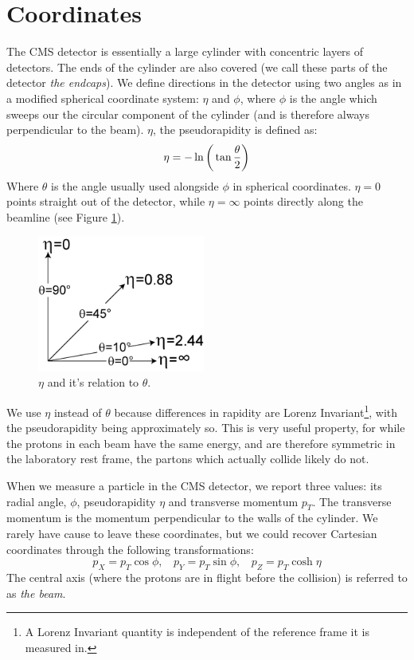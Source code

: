 \section{Coordinates}
The CMS detector is essentially a large cylinder with concentric layers of detectors. The ends of the cylinder are also covered (we call these parts of the detector \textit{the endcaps}). We define directions in the detector using two angles as in a modified spherical coordinate system: $\eta$ and $\phi$, where $\phi$ is the angle which sweeps our the circular component of the cylinder (and is therefore always perpendicular to the beam). $\eta$, the pseudorapidity is defined as:
\begin{equation}
    \eta = -\ln\bigg{(}\tan\frac{\theta}{2}\bigg{)}
\end{equation}
Where $\theta$ is the angle usually used alongside $\phi$ in spherical coordinates. $\eta = 0$ points straight out of the detector, while $\eta = \infty$ points directly along the beamline (see Figure \ref{Fig:CMS:eta}).
\begin{figure}[h!]
    \centering
        \includegraphics[width=0.49\textwidth]{F3/Pseudorapidity2}
        \caption{$\eta$ and it's relation to $\theta$.}
        \label{Fig:CMS:eta}
\end{figure}
We use $\eta$ instead of $\theta$ because differences in rapidity are Lorenz Invariant\footnote{A Lorenz Invariant quantity is independent of the reference frame it is measured in.}, with the pseudorapidity being approximately so. This is very useful property, for while the protons in each beam have the same energy, and are therefore symmetric in the laboratory rest frame, the partons which actually collide likely do not.

When we measure a particle in the CMS detector, we report three values: its radial angle, $\phi$, pseudorapidity $\eta$ and transverse momentum $p_{T}$. The transverse momentum is the momentum perpendicular to the walls of the cylinder. We rarely have cause to leave these coordinates, but we could recover Cartesian coordinates through the following transformations:
\begin{equation}
p_X = p_T\cos\phi, \ \ \ \ 
p_Y = p_T\sin\phi, \ \ \ \
p_Z = p_T\cosh\eta
\end{equation}
The central axis (where the protons are in flight before the collision) is referred to as \textit{the beam}.

